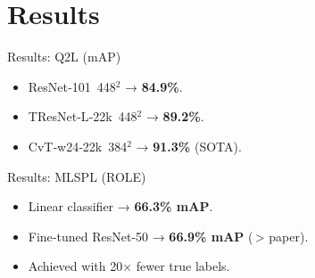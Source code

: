 \section{Results}

\begin{frame}{Results: Q2L (mAP)}
  \begin{itemize}
    \item ResNet‑101 448$^2$ → \textbf{84.9\%}.
    \item TResNet‑L‑22k 448$^2$ → \textbf{89.2\%}.
    \item CvT‑w24‑22k 384$^2$ → \textbf{91.3\%} (SOTA).
  \end{itemize}
\end{frame}

\begin{frame}{Results: MLSPL (ROLE)}
  \begin{itemize}
    \item Linear classifier → \textbf{66.3\% mAP}.
    \item Fine‑tuned ResNet‑50 → \textbf{66.9\% mAP} (\,> paper).
    \item Achieved with 20× fewer true labels.
  \end{itemize}
\end{frame}
